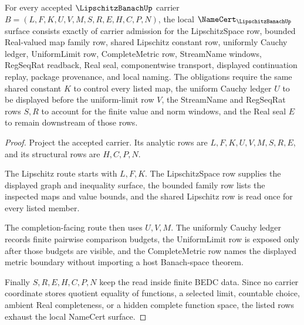 \begin{theorem}
\label{thm:lipschitz-banach-namecert-obligations}
For every accepted $\LipschitzBanachUp$ carrier $B=(L,F,K,U,V,M,S,R,E,H,C,P,N)$, the local $\NameCert_{\LipschitzBanachUp}$ surface consists exactly of carrier admission for the LipschitzSpace row, bounded Real-valued map family row, shared Lipschitz constant row, uniformly Cauchy ledger, UniformLimit row, CompleteMetric row, StreamName windows, RegSeqRat readback, Real seal, componentwise transport, displayed continuation replay, package provenance, and local naming. The obligations require the same shared constant $K$ to control every listed map, the uniform Cauchy ledger $U$ to be displayed before the uniform-limit row $V$, the StreamName and RegSeqRat rows $S,R$ to account for the finite value and norm windows, and the Real seal $E$ to remain downstream of those rows.
\end{theorem}
\begin{proof}
Project the accepted carrier. Its analytic rows are $L,F,K,U,V,M,S,R,E$, and its structural rows are $H,C,P,N$.

The Lipschitz route starts with $L,F,K$. The LipschitzSpace row supplies the displayed graph and inequality surface, the bounded family row lists the inspected maps and value bounds, and the shared Lipschitz row is read once for every listed member.

The completion-facing route then uses $U,V,M$. The uniformly Cauchy ledger records finite pairwise comparison budgets, the UniformLimit row is exposed only after those budgets are visible, and the CompleteMetric row names the displayed metric boundary without importing a host Banach-space theorem.

Finally $S,R,E,H,C,P,N$ keep the read inside finite BEDC data. Since no carrier coordinate stores quotient equality of functions, a selected limit, countable choice, ambient Real completeness, or a hidden complete function space, the listed rows exhaust the local NameCert surface.
\end{proof}

